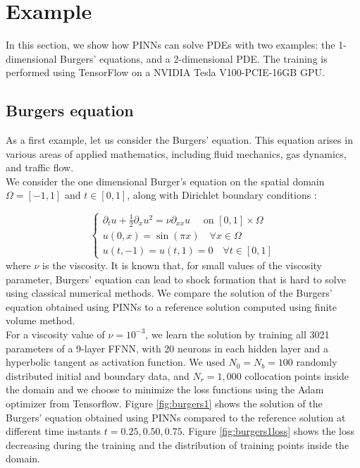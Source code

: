 \documentclass[12pt,openany]{amsbook}
\begin{document}
\section{Example}

In this section, we show how PINNs can solve PDEs with two examples: the 1-dimensional Burgers' equations, 
and a 2-dimensional PDE. The training is performed using TensorFlow on a NVIDIA Tesla V100-PCIE-16GB GPU.

\subsection{Burgers equation}

As a first example, let us consider the Burgers' equation. This equation arises
in various areas of applied mathematics, including fluid mechanics, gas dynamics, and traffic flow.\\

We consider the one dimensional Burger’s equation on the spatial domain $\Omega = [-1,1]$ and $t\in [0,1]$,
along with Dirichlet boundary conditions :

$$
\begin{cases}
    \partial_t u + \frac{1}{2}\partial_x u^2 = \nu \partial_{xx}u \quad \text{ on } [0,1]\times\Omega\\
    u(0,x) = \sin(\pi x) \quad \forall x \in \Omega\\
    u(t,-1) = u(t,1) = 0 \quad \forall t \in [0,1]
\end{cases}
$$
where $\nu$ is the viscosity. It is known that, for small values of
the viscosity parameter, Burgers’ equation can lead to shock formation that
is hard to solve using classical numerical methods.
We compare the solution of the Burgers' equation obtained using PINNs to a 
reference solution computed using finite volume method. \\

For a viscosity value of $\nu=10^{-3}$, we learn the solution by training all 3021 parameters of a 9-layer FFNN, 
with 20 neurons in each hidden layer and a hyperbolic tangent as activation function. 
We used $N_0 = N_b = 100$ randomly distributed initial and boundary data, and $N_r = 1,000$ collocation points inside
the domain and we choose to minimize the loss functions using the Adam optimizer from Tensorflow.
Figure \ref{fig:burgers1} shows the solution of the Burgers' equation obtained using PINNs compared to the
reference solution at different time instants $t = 0.25, 0.50, 0.75$.
Figure \ref{fig:burgers1loss} shows the loss decreasing during the training and the distribution of training points
inside the domain.\\
\end{document}
